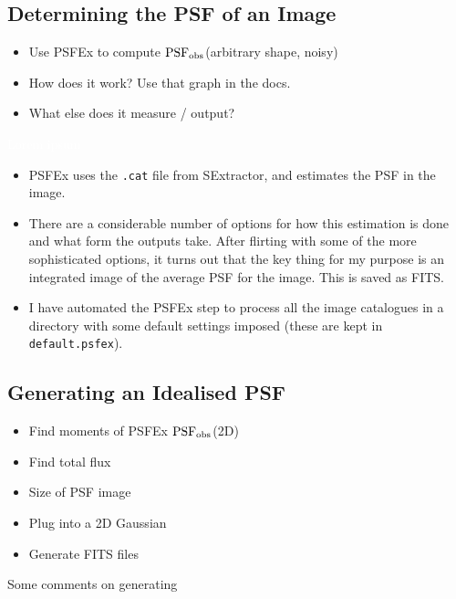 \documentclass[letterpaper, 11pt]{article}
\def\psfobs{\ensuremath{{\rm PSF_{obs}}}\xspace}
\def\wspace{\textcolor{white}{Lorem ipsum}}
\begin{document}
\subsection{Determining the PSF of an Image}
\label{sec:psfex}

\begin{itemize}
	\item Use PSFEx to compute \psfobs (arbitrary shape, noisy)
	\item How does it work? Use that graph in the docs.
	\item What else does it measure / output?
\end{itemize}

\wspace

\begin{itemize}
	\item PSFEx uses the \texttt{.cat} file from SExtractor, and estimates the PSF in the image.
	\item There are a considerable number of options for how this estimation is done and what form the outputs take. After flirting with some of the more sophisticated options, it turns out that the key thing for my purpose is an integrated image of the average PSF for the image. This is saved as FITS.
	\item I have automated the PSFEx step to process all the image catalogues in a directory with some default settings imposed (these are kept in \texttt{default.psfex}).
\end{itemize}

\subsection{Generating an Idealised PSF}

\begin{itemize}
	\item Find moments of PSFEx \psfobs (2D)
	\item Find total flux
	\item Size of PSF image
	\item Plug into a 2D Gaussian 
	\item Generate FITS files
\end{itemize}

Some comments on generating 
\end{document}
